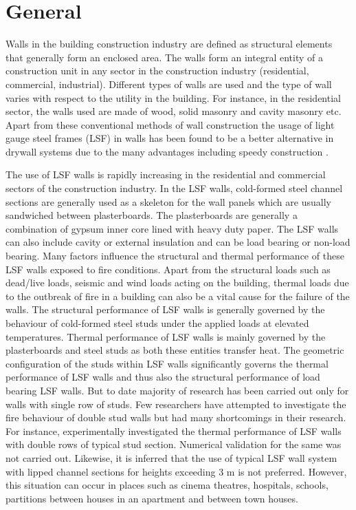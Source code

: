 \section{General}
Walls in the building construction industry are defined as structural elements that generally form an enclosed area. The walls form an integral entity of a construction unit in any sector in the construction industry (residential, commercial, industrial). Different types of walls are used and the type of wall varies with respect to the utility in the building. For instance, in the residential sector, the walls used are made of wood, solid masonry and cavity masonry etc. Apart from these conventional methods of wall construction the usage of light gauge steel frames (LSF) in walls has been found to be a better alternative in drywall systems due to the many advantages including speedy construction . 

The use of LSF walls is rapidly increasing in the residential and commercial sectors of the construction industry. In the LSF walls, cold-formed steel channel sections are generally used as a skeleton for the wall panels which are usually sandwiched between plasterboards. The plasterboards are generally a combination of gypsum inner core lined with heavy duty paper. The LSF walls can also include cavity or external insulation and can be load bearing or non-load bearing. Many factors influence the structural and thermal performance of these LSF walls exposed to fire conditions. Apart from the structural loads such as dead/live loads, seismic and wind loads acting on the building, thermal loads due to the outbreak of fire in a building can also be a vital cause for the failure of the walls.  The structural performance of LSF walls is generally governed by the behaviour of cold-formed steel studs under the applied loads at elevated temperatures. Thermal performance of LSF walls is mainly governed by the plasterboards and steel studs as both these entities transfer heat. The geometric configuration of the studs within LSF walls significantly governs the thermal performance of LSF walls and thus also the structural performance of load bearing LSF walls. But to date majority of research has been carried out only for walls with single row of studs. Few researchers have attempted to investigate the fire behaviour of double stud walls but had many shortcomings in their research. For instance, \citet{Kodur2006} experimentally investigated the thermal performance of LSF walls with double rows of typical stud section. Numerical validation for the same was not carried out. Likewise, it is inferred that the use of typical LSF wall system with lipped channel sections for heights exceeding 3 m is not preferred. However, this situation can occur in places such as cinema theatres, hospitals, schools, partitions between houses in an apartment and between town houses.

